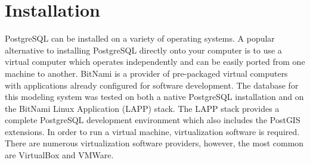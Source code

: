 %
%
%
%
%
\section{Installation}
\label{sec:dbinstall}
PostgreSQL can be installed on a variety of operating systems. 
A popular alternative to installing PostgreSQL directly onto your computer is to use a virtual computer which operates independently and can be easily ported from one machine to another.  
BitNami\footnotemark {} is a provider of  pre-packaged virtual computers with applications already configured for software development. 
The database for this modeling system was tested on both a native PostgreSQL installation and on the BitNami Linux Application (LAPP) stack. 
The LAPP stack provides a complete PostgreSQL development environment which also includes the PostGIS extensions.  
In order to run a virtual machine, virtualization software is required.  
There are numerous virtualization software providers, however, the most common are VirtualBox\footnotemark {} and VMWare\footnotemark {}.  

